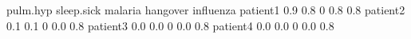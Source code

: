 \begin{Schunk}
% --begin: "comp.quant.atleast"
\begin{Soutput}
         pulm.hyp sleep.sick malaria hangover influenza
patient1      0.9        0.8       0      0.8       0.8
patient2      0.1        0.1       0      0.0       0.8
patient3      0.0        0.0       0      0.0       0.8
patient4      0.0        0.0       0      0.0       0.8
\end{Soutput}
%
% --end: "comp.quant.atleast"
\end{Schunk}

